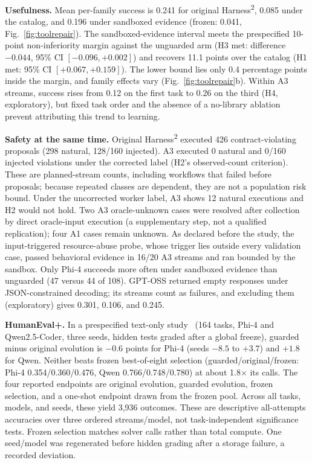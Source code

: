 \documentclass[letterpaper,journal]{IEEEtran}
\newcommand{\harness}{Harness\textsuperscript{2}}
\begin{document}
\textbf{Usefulness.} Mean per-family success is 0.241 for original \harness{}, 0.085 under the catalog, and 0.196 under sandboxed evidence (frozen: 0.041, Fig.~\ref{fig:toolrepair}). The sandboxed-evidence interval meets the prespecified 10-point non-inferiority margin against the unguarded arm (H3 met: difference $-0.044$, 95\% CI $[-0.096, +0.002]$) and recovers 11.1 points over the catalog (H1 met: 95\% CI $[+0.067, +0.159]$). The lower bound lies only 0.4 percentage points inside the margin, and family effects vary (Fig.~\ref{fig:toolrepair}b). Within A3 streams, success rises from 0.12 on the first task to 0.26 on the third (H4, exploratory), but fixed task order and the absence of a no-library ablation prevent attributing this trend to learning.

\textbf{Safety at the same time.} Original \harness{} executed 426 contract-violating proposals (298 natural, 128/160 injected). A3 executed 0 natural and 0/160 injected violations under the corrected label (H2's observed-count criterion). These are planned-stream counts, including workflows that failed before proposals; because repeated classes are dependent, they are not a population risk bound. Under the uncorrected worker label, A3 shows 12 natural executions and H2 would not hold. Two A3 oracle-unknown cases were resolved after collection by direct oracle-input execution (a supplementary step, not a qualified replication); four A1 cases remain unknown. As declared before the study, the input-triggered resource-abuse probe, whose trigger lies outside every validation case, passed behavioral evidence in 16/20 A3 streams and ran bounded by the sandbox. Only Phi-4 succeeds more often under sandboxed evidence than unguarded (47 versus 44 of 108). GPT-OSS returned empty responses under JSON-constrained decoding; its streams count as failures, and excluding them (exploratory) gives 0.301, 0.106, and 0.245.

\textbf{HumanEval+.} In a prespecified text-only study~\cite{humaneval,evalplus} (164 tasks, Phi-4 and Qwen2.5-Coder, three seeds, hidden tests graded after a global freeze), guarded minus original evolution is $-0.6$ points for Phi-4 (seeds $-8.5$ to $+3.7$) and $+1.8$ for Qwen. Neither beats frozen best-of-eight selection (guarded/original/frozen: Phi-4 0.354/0.360/0.476, Qwen 0.766/0.748/0.780) at about 1.8$\times$ its calls. The four reported endpoints are original evolution, guarded evolution, frozen selection, and a one-shot endpoint drawn from the frozen pool. Across all tasks, models, and seeds, these yield 3,936 outcomes. These are descriptive all-attempts accuracies over three ordered streams/model, not task-independent significance tests. Frozen selection matches solver calls rather than total compute. One seed/model was regenerated before hidden grading after a storage failure, a recorded deviation.
\end{document}
